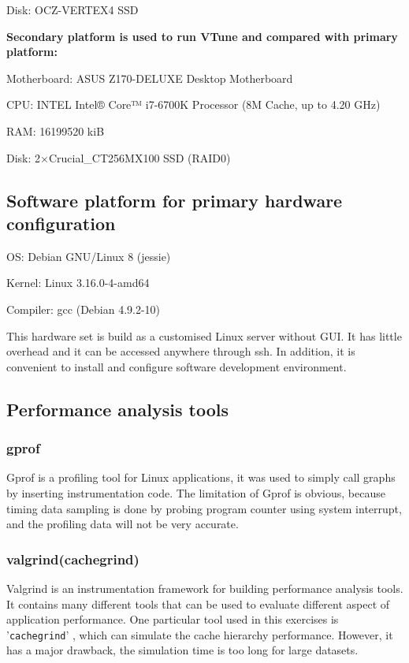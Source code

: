 \documentclass[conference]{IEEEtran}
\begin{document}
Disk:    OCZ-VERTEX4 SSD

\textbf{Secondary platform is used to run VTune and compared with primary platform:}

Motherboard:    ASUS Z170-DELUXE Desktop Motherboard

CPU:    INTEL Intel® Core™ i7-6700K Processor (8M Cache, up to 4.20 GHz)

RAM:    16199520 kiB

Disk:    2$\times$Crucial\_CT256MX100 SSD (RAID0)
\subsection{Software platform for primary hardware configuration}

OS:    Debian GNU/Linux 8 (jessie)

Kernel:    Linux 3.16.0-4-amd64

Compiler:    gcc (Debian 4.9.2-10)

This hardware set is build as a customised Linux server without GUI. It has little overhead and it can be accessed anywhere through ssh. In addition, it is convenient to install and configure software development environment.

\subsection{Performance analysis tools}

\subsubsection{gprof}

Gprof is a profiling tool for Linux applications, it was used to simply call graphs by inserting instrumentation code. The limitation of Gprof is obvious, because timing data sampling is done by probing program counter using system interrupt, and the profiling data will not be very accurate.
\cite{graham1982gprof}

\subsubsection{valgrind(cachegrind)}

Valgrind \cite{nethercote2003valgrind} is an instrumentation framework for building performance analysis tools. It contains many different tools that can be used to evaluate different aspect of application performance. One particular tool used in this exercises is '\texttt{cachegrind}' \cite{seward2004cachegrind}, which can simulate the cache hierarchy performance. However, it has a major drawback, the simulation time is too long for large datasets.
\end{document}

